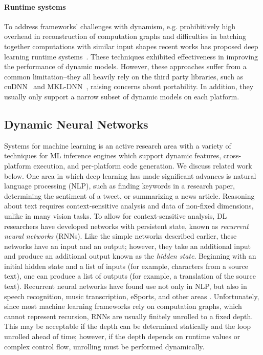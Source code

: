 \paragraph{Runtime systems} To address frameworks' challenges with dynamism,
e.g. prohibitively high overhead in reconstruction of computation
graphs and difficulties in batching together computations with
similar input shapes recent works has proposed
deep learning runtime systems~\citep{xu2018cavs, gao2018low}.
These techniques exhibited effectiveness in improving the
performance of dynamic models.
However, these approaches suffer
from a common limitation--they all heavily rely on the third party libraries,
such as cuDNN~\citep{cudnn} and MKL-DNN~\citep{mkldnn},
raising concerns about portability.
In addition, they usually only support a narrow subset of dynamic models on each platform.


\subsection{Dynamic Neural Networks}

Systems for machine learning is an active research area with a variety of techniques
  for ML inference engines which support dynamic features, cross-platform execution, and per-platform code generation. We discuss related work below.
One area in which deep learning has made significant advances is
  natural language processing (NLP), such as finding keywords in a
  research paper, determining the sentiment of a tweet,
  or summarizing a news article.
Reasoning about text requires context-sensitive analysis and data of
  non-fixed dimensions, unlike in many vision tasks.
To allow for context-sensitive analysis, DL researchers have developed networks with persistent
state, known as \textit{recurrent neural networks}  (RNNs). Like the simple networks described
earlier, these networks have an input and an output; however, they take an additional input and
produce an additional output known as the \textit{hidden state}. Beginning with an initial hidden
state and a list of inputs (for example, characters from a source text), one can produce a
list of outputs (for example, a translation of the source text).
Recurrent neural networks have found use not only in NLP, but also in speech recognition, music
transcription, eSports, and other areas \citep{lstm, speech_recognition, OpenAI_dota}.
Unfortunately, since most machine learning frameworks rely on computation graphs,
  which cannot represent recursion, RNNs are usually finitely unrolled to a fixed depth.
This may be acceptable if the depth can be determined statically and the loop unrolled
  ahead of time; however, if the depth depends on runtime values or complex control flow,
  unrolling must be performed dynamically.
